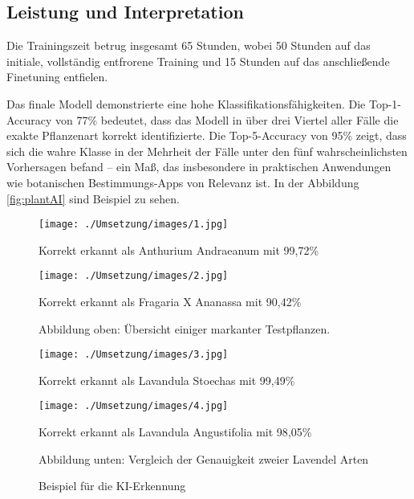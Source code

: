 \subsection{Leistung und Interpretation}

Die Trainingszeit betrug insgesamt 65 Stunden, wobei 50 Stunden auf das initiale, vollständig entfrorene Training und 15 Stunden auf das anschließende Finetuning entfielen.

Das finale Modell demonstrierte eine hohe Klassifikationsfähigkeiten. Die Top-1-Accuracy von 77\% bedeutet, dass das Modell in über drei Viertel aller Fälle die exakte Pflanzenart korrekt identifizierte. Die Top-5-Accuracy von 95\% zeigt, dass sich die wahre Klasse in der Mehrheit der Fälle unter den fünf wahrscheinlichsten Vorhersagen befand – ein Maß, das insbesondere in praktischen Anwendungen wie botanischen Bestimmungs-Apps von Relevanz ist. In der Abbildung \vref{fig:plantAI} sind Beispiel zu sehen.

\begin{figure}[H]
	\centering
	
	\begin{minipage}[t]{0.40\textwidth}
		\centering
		\texttt{[image: ./Umsetzung/images/1.jpg]}
		\caption{Korrekt erkannt als Anthurium Andraeanum mit 99,72\%}
	\end{minipage}
	\hfill
	\begin{minipage}[t]{0.40\textwidth}
		\centering
		\texttt{[image: ./Umsetzung/images/2.jpg]}
		\caption{Korrekt erkannt als Fragaria X Ananassa mit 90,42\%}
	\end{minipage}
	
	\vspace{0.3em}
	\begin{minipage}{\textwidth}
		\centering
		\small Abbildung oben: Übersicht einiger markanter Testpflanzen.
	\end{minipage}
	
	\vspace{1em}
	
	\begin{minipage}[t]{0.40\textwidth}
		\centering
		\texttt{[image: ./Umsetzung/images/3.jpg]}
		\caption{Korrekt erkannt als Lavandula Stoechas mit 99,49\%}
	\end{minipage}
	\hfill
	\begin{minipage}[t]{0.40\textwidth}
		\centering
		\texttt{[image: ./Umsetzung/images/4.jpg]}
		\caption{Korrekt erkannt als Lavandula Angustifolia mit 98,05\%}
	\end{minipage}
	
	\vspace{0.3em}
	\begin{minipage}{\textwidth}
		\centering
		\small Abbildung unten: Vergleich der Genauigkeit zweier Lavendel Arten
	\end{minipage}
	
	\caption{Beispiel für die KI-Erkennung}
	\label{fig:plantAI}
\end{figure}



